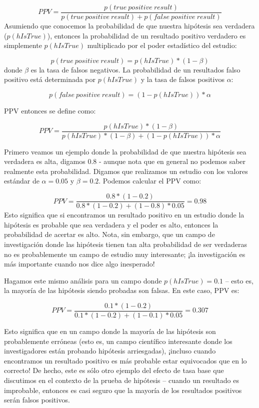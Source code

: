 \documentclass[
  12pt,
]{book}
\theoremstyle{definition}
\theoremstyle{definition}
\theoremstyle{definition}
\theoremstyle{remark}
\begin{document}
\[
PPV = \frac{p(true\ positive\ result)}{p(true\ positive\ result) + p(false\ positive\ result)}
\]
Asumiendo que conocemos la probabilidad de que nuestra hipótesis sea verdadera (\(p(hIsTrue)\)), entonces la probabilidad de un resultado positivo verdadero es simplemente \(p(hIsTrue)\) multiplicado por el poder estadístico del estudio:

\[
p(true\ positive\ result) = p(hIsTrue) * (1 - \beta)
\]
donde \(\beta\) es la tasa de falsos negativos. La probabilidad de un resultados falso positivo está determinada por \(p(hIsTrue)\) y la tasa de falsos positivos \(\alpha\):

\[
p(false\ positive\ result) = (1 - p(hIsTrue)) * \alpha
\]

PPV entonces se define como:

\[
PPV = \frac{p(hIsTrue) * (1 - \beta)}{p(hIsTrue) * (1 - \beta) + (1 - p(hIsTrue)) * \alpha}
\]

Primero veamos un ejemplo donde la probabilidad de que nuestra hipótesis sea verdadera es alta, digamos 0.8 - aunque nota que en general no podemos saber realmente esta probabilidad. Digamos que realizamos un estudio con los valores estándar de \(\alpha=0.05\) y \(\beta=0.2\). Podemos calcular el PPV como:

\[
PPV = \frac{0.8 * (1 - 0.2)}{0.8 * (1 - 0.2) + (1 - 0.8) * 0.05} = 0.98
\]
Esto significa que si encontramos un resultado positivo en un estudio donde la hipótesis es probable que sea verdadera y el poder es alto, entonces la probabilidad de acertar es alto. Nota, sin embargo, que un campo de investigación donde las hipótesis tienen tan alta probabilidad de ser verdaderas no es probablemente un campo de estudio muy interesante; ¡la investigación es más importante cuando nos dice algo inesperado!

Hagamos este mismo análisis para un campo donde \(p(hIsTrue)=0.1\) -- esto es, la mayoría de las hipótesis siendo probadas son falsas. En este caso, PPV es:

\[
PPV = \frac{0.1 * (1 - 0.2)}{0.1 * (1 - 0.2) + (1 - 0.1) * 0.05} = 0.307
\]

Esto significa que en un campo donde la mayoría de las hipótesis son probablemente erróneas (esto es, un campo científico interesante donde los investigadores están probando hipótesis arriesgadas), ¡incluso cuando encontramos un resultado positivo es más probable estar equivocados que en lo correcto! De hecho, este es sólo otro ejemplo del efecto de tasa base que discutimos en el contexto de la prueba de hipótesis -- cuando un resultado es improbable, entonces es casi seguro que la mayoría de los resultados positivos serán falsos positivos.
\end{document}
